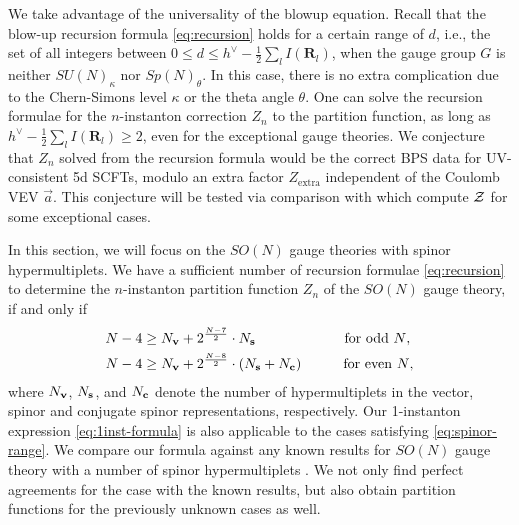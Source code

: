 \documentclass[letterpaper, 11pt]{article}
\def\CZ{{\cal Z}}
\def\k{\kappa}
\begin{document}
{We take advantage of the universality of the blowup equation. Recall that the blow-up recursion formula \eqref{eq:recursion} holds for a certain range of $d$, i.e., the set of all integers between $0 \leq d \leq h^\vee - \frac{1}{2}\sum_l I(\mathbf{R}_l)$, when the gauge group $G$ is neither $ SU(N)_\k$ nor $Sp(N)_\theta$. In this case, there is no extra complication due to the Chern-Simons level $\kappa$ or the theta angle $\theta$.
One can solve the recursion formulae for the $n$-instanton correction $Z_n$ to the partition function, as long as $h^\vee - \frac{1}{2}\sum_l I(\mathbf{R}_l) \geq 2$, even for the exceptional gauge theories. We conjecture that $Z_n$ solved from the recursion formula would be the correct BPS data for UV-consistent 5d SCFTs, modulo an extra factor $Z_\text{extra}$ independent of the Coulomb VEV $\vec{a}$. This conjecture will be tested via comparison with \cite{Kim:2018gjo, DelZotto:2018tcj,Hayashi:2019yxj} which compute $\CZ$ for some exceptional cases. 


In this section, we will focus on the $SO(N)$ gauge theories with spinor hypermultiplets.
We have a sufficient number of recursion formulae \eqref{eq:recursion} to determine the $n$-instanton partition function $Z_n$ of the $SO(N)$ gauge theory, if and only if  
\begin{align}
  \label{eq:spinor-range}
  \begin{split}
  N-4 &\geq N_{\bf v} + 2^{\frac{N-7}{2}}\cdot N_{\bf s} \qquad\qquad\qquad \text{ for odd $N$},\\
  N-4 &\geq N_{\bf v} + 2^{\frac{N-8}{2}}\cdot (N_{\bf s} + N_{\bf c})\qquad\quad \text{for even $N$},
  \end{split}
\end{align}
where $N_{\bf v}$, $N_{\bf s}$, and $N_{\bf c}$ denote the number of hypermultiplets in the vector, spinor and conjugate spinor representations, respectively. Our 1-instanton expression \eqref{eq:1inst-formula} is also applicable to the cases satisfying \eqref{eq:spinor-range}. 
We compare our formula against any known results for $SO(N)$ gauge theory with a number of spinor hypermultiplets  \cite{Kim:2018gjo, DelZotto:2018tcj}. We not only find perfect agreements for the case with the known results, but also  obtain partition functions for the previously unknown cases as well. 

}
\end{document}

